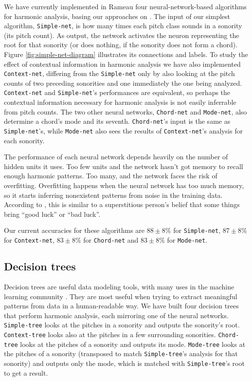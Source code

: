 \documentclass{article}
\begin{document}
We have currently implemented in Rameau four neural-network-based
algorithms for harmonic analysis, basing our approaches on
\cite{tsui:harmonic}. The input of our simplest algorithm,
\texttt{Simple-net}, is how many times each pitch class sounds in
a sonority (its pitch count). As output, the network activates the
neuron representing the root for that sonority (or does nothing, if
the sonority does not form a chord). Figure
\ref{fig:simple-net-diagram} illustrates its connections and labels.
To study the effect of contextual information in harmonic analysis we
have also implemented \texttt{Context-net}, differing from the
\texttt{Simple-net} only by also looking at the pitch counts of
two preceding sonorities and one immediately the one being analyzed.
\texttt{Context-net} and \texttt{Simple-net}'s performances are
equivalent, so perhaps the contextual information necessary for
harmonic analysis is not easily inferrable from pitch counts. The two
other neural networks, \texttt{Chord-net} and \texttt{Mode-net}, also
determine a chord's mode and its seventh. \texttt{Chord-net}'s input
is the same as \texttt{Simple-net}'s, while \texttt{Mode-net} also
sees the results of \texttt{Context-net}'s analysis for each sonority.

The performance of each neural network depends heavily on the number
of hidden units it uses. Too few units and the network hasn't got
memory to recall enough harmonic patterns. Too many, and the network
faces the risk of overfitting. Overfitting happens when the neural
network has too much memory, so it starts inferring nonexistent
patterns from noise in the training data. According to
\cite{white.ea:superstitious}, this is similar to a superstitious
person's belief that some things bring ``good luck'' or ``bad luck''.

Our current accuracies for these algorithms are $88\pm 8\%$ for
\texttt{Simple-net}, $87 \pm 8\%$ for \texttt{Context-net}, $83 \pm
8\%$ for \texttt{Chord-net} and $83 \pm 8\%$ for \texttt{Mode-net}.

\subsection{Decision trees}
\label{sec:decision-trees}

Decision trees are useful data modeling tools, with many uses in the
machine learning community \cite{mitchell:machine,
  russell.ea:artificial}. They are most useful when trying to extract
meaningful patterns from data in a human-readable way. We have built
four decision trees that perform harmonic analysis, each mirroring one
of the neural networks. \texttt{Simple-tree} looks at the pitches in a
sonority and outputs the sonority's root. \texttt{Context-tree} looks
also at the pitches in a few surrounding
sonorities. \texttt{Chord-tree} looks at the pitches of a sonority and
outputs its mode. \texttt{Mode-tree} looks at the pitches of a
sonority (transposed to match \texttt{Simple-tree}'s analysis for that
sonority) and outputs only the mode, which is matched with
\texttt{Simple-tree}'s root to get a result.
\end{document}
